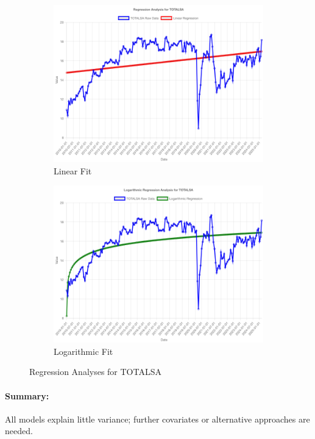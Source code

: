 \documentclass[11pt,a4paper]{article}
\begin{document}
\begin{figure}[htbp]
  \centering
  \begin{subfigure}[b]{0.48\textwidth}
    \includegraphics[width=\textwidth]{backend/analyses/TOTALSA_analysis.png}
    \caption{Linear Fit}
  \end{subfigure}
  \hfill
  \begin{subfigure}[b]{0.48\textwidth}
    \includegraphics[width=\textwidth]{backend/analyses/TOTALSA_log_analysis.png}
    \caption{Logarithmic Fit}
  \end{subfigure}
  \caption{Regression Analyses for TOTALSA}
\end{figure}

\paragraph{Summary:}
All models explain little variance; further covariates or alternative approaches are needed.
\end{document}
